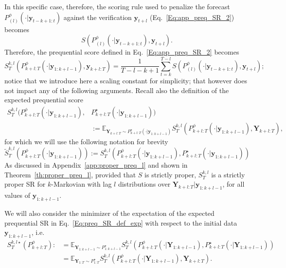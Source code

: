 \documentclass[twoside,11pt]{article}
\newcommand{\E}{\mathbb{E}}
\newcommand{\ddobs}{\mathbf{y}}
\newcommand{\Ddobs}{\mathbf{Y}}
\newcommand{\ddobsuptminus}{\mathbf{y}_{t-k+1:t}}
\newcommand{\Ddobsupkplusl}{\mathbf{Y}_{1:k+l-1}}
\begin{document}
	
	In this specific case, therefore, the scoring rule used to penalize the forecast $ P^\phi_{(l)}(\cdot|\ddobsuptminus)$ against the verification $\ddobs_{t+l}  $ (Eq.~\ref{Eq:app_preq_SR_2}) becomes
	\begin{equation}\label{}
	S(P^\phi_{(l)}(\cdot|\ddobsuptminus),\ddobs_{t+l}   ).
	\end{equation}
	Therefore, the prequential score defined in Eq.~\eqref{Eq:app_preq_SR_2} becomes
	\begin{equation}\label{Eq:preq_SR_def}
	S_T^{k,l}(P^\phi_{k+l:T}(\cdot|\ddobs_{1:k+l-1}), \ddobs_{k+l:T}) = \frac{1}{T-l-k+1} \sum_{t=k}^{T-l}	S(P_{(l)}^\phi(\cdot|\ddobsuptminus),\ddobs_{t+l});
	\end{equation}
	notice that we introduce here a scaling constant for simplicity; that however does not impact any of the following arguments.
	Recall also the definition of the expected prequential score
	\begin{equation}\label{Eq:preq_SR_def_exp}
	\begin{aligned}
	S_T^{k,l}(P^\phi_{k+l:T}(\cdot|\ddobs_{1:k+l-1}),&P^\star_{k+l:T}(\cdot|\ddobs_{1:k+l-1})) \\
	&:= \E_{\Ddobs_{k+l:T}\sim P^\star_{k+l:T}(\cdot|\ddobs_{1:k+l-1})} 	S_T^{k,l}(P^\phi_{k+l:T}(\cdot|\ddobs_{1:k+l-1}), \Ddobs_{k+l:T}),
	\end{aligned}
	\end{equation}
	for which we will use the following notation for brevity
	\begin{equation}\label{}
	\tilde S_T^{k,l}(P^\phi_{k+l:T}(\cdot|\ddobs_{1:k+l-1})) := S_T^{k,l}(P^\phi_{k+l:T}(\cdot|\ddobs_{1:k+l-1}),P^\star_{k+l:T}(\cdot|\ddobs_{1:k+l-1}))
	\end{equation}
	As discussed in Appendix~\ref{app:proper_preq_l} and shown in Theorem~\ref{th:proper_preq_l}, provided that $ S $ is strictly proper, $ S_T^{k,l} $ is a strictly proper SR for $ k $-Markovian with lag $ l $ distributions over $ \Ddobs_{k+l:T}|\ddobs_{1:k+l-1} $, for all values of $ \ddobs_{1:k+l-1} $. 
	
	We will also consider the minimizer of the expectation of the expected prequential SR in Eq.~\eqref{Eq:preq_SR_def_exp} with respect to the initial data $ \ddobs_{1:k+l-1} $, i.e.
	\begin{equation}\label{Eq:preq_SR_def_exp_exp}
	\begin{aligned}
	S_T^{k,l\star}(P^\phi_{k+l:T}):&=	\E_{\Ddobsupkplusl\sim P^\star_{1:k+l-1} } 	S_T^{k,l}(P^\phi_{k+l:T}(\cdot|\Ddobs_{1:k+l-1}),P^\star_{k+l:T}(\cdot|\Ddobs_{1:k+l-1})) \\
	&= \E_{\Ddobs_{1:T}\sim P^\star_{1:T}} S_T^{k,l}(P_{k+l:T}^\phi(\cdot|\Ddobsupkplusl), \Ddobs_{k+l:T}).
	\end{aligned}
	\end{equation}
	
\end{document}
